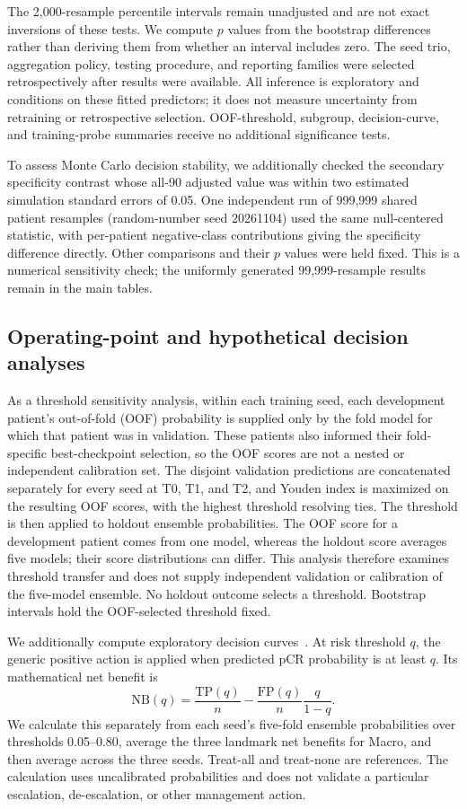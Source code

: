 The 2,000-resample percentile intervals remain unadjusted and are not exact inversions of these tests. We compute $p$ values from the bootstrap differences rather than deriving them from whether an interval includes zero. The seed trio, aggregation policy, testing procedure, and reporting families were selected retrospectively after results were available. All inference is exploratory and conditions on these fitted predictors; it does not measure uncertainty from retraining or retrospective selection. OOF-threshold, subgroup, decision-curve, and training-probe summaries receive no additional significance tests.

To assess Monte Carlo decision stability, we additionally checked the secondary specificity contrast whose all-90 adjusted value was within two estimated simulation standard errors of 0.05. One independent run of 999,999 shared patient resamples (random-number seed 20261104) used the same null-centered statistic, with per-patient negative-class contributions giving the specificity difference directly. Other comparisons and their $p$ values were held fixed. This is a numerical sensitivity check; the uniformly generated 99,999-resample results remain in the main tables.

\subsection{Operating-point and hypothetical decision analyses}
As a threshold sensitivity analysis, within each training seed, each development patient's out-of-fold (OOF) probability is supplied only by the fold model for which that patient was in validation. These patients also informed their fold-specific best-checkpoint selection, so the OOF scores are not a nested or independent calibration set. The disjoint validation predictions are concatenated separately for every seed at T0, T1, and T2, and Youden index is maximized on the resulting OOF scores, with the highest threshold resolving ties. The threshold is then applied to holdout ensemble probabilities. The OOF score for a development patient comes from one model, whereas the holdout score averages five models; their score distributions can differ. This analysis therefore examines threshold transfer and does not supply independent validation or calibration of the five-model ensemble. No holdout outcome selects a threshold. Bootstrap intervals hold the OOF-selected threshold fixed.

We additionally compute exploratory decision curves~\citep{vickers2006dca}. At risk threshold $q$, the generic positive action is applied when predicted pCR probability is at least $q$. Its mathematical net benefit is
\begin{equation}
 \mathrm{NB}(q)=\frac{\mathrm{TP}(q)}{n}
 -\frac{\mathrm{FP}(q)}{n}\frac{q}{1-q}.
\end{equation}
We calculate this separately from each seed's five-fold ensemble probabilities over thresholds 0.05--0.80, average the three landmark net benefits for Macro, and then average across the three seeds. Treat-all and treat-none are references. The calculation uses uncalibrated probabilities and does not validate a particular escalation, de-escalation, or other management action.

